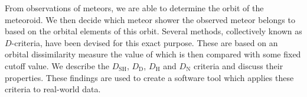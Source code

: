 From observations of meteors, we are able to determine the orbit of the meteoroid. We then decide which meteor shower the observed meteor belongs to based on the orbital elements of this orbit. Several methods, collectively known as $D$-criteria, have been devised for this exact purpose. These are based on an orbital dissimilarity measure the value of which is then compared with some fixed cutoff value. We describe the $D_\text{SH}$, $D_\text{D}$, $D_\text{H}$ and $D_\text{N}$ criteria and discuss their properties. These findings are used to create a software tool which applies these criteria to real-world data.